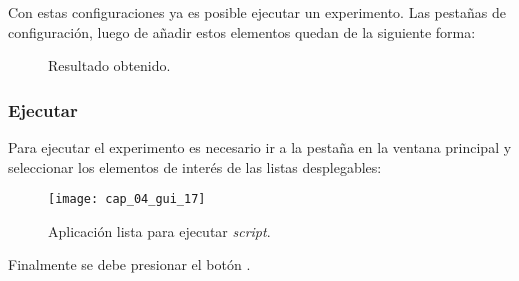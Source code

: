 \documentclass[\main/Main.tex]{subfiles}
\begin{document}
                Con estas configuraciones ya es posible ejecutar un experimento. Las pestañas de configuración, luego de añadir estos elementos quedan de la siguiente forma:
                \begin{figure}[H]
                    \centering
                     \hspace{5mm}
                    \caption{Resultado obtenido.}
                    \label{fig:04_gui_final_01}
                \end{figure} 

            \subsubsection{Ejecutar}
                Para ejecutar el experimento es necesario ir a la pestaña  en la ventana principal y seleccionar los elementos de interés de las listas desplegables:
                \begin{figure}[H]
                    \centering
                    \texttt{[image: cap\_04\_gui\_17]}
                    \caption{Aplicación lista para ejecutar \textit{script}.}
                    \label{fig:04_gui_final_02}
                \end{figure} 

                Finalmente se debe presionar el botón .

    \newpage
\end{document}
